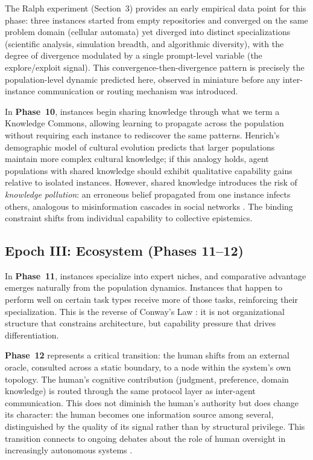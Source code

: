 The Ralph experiment (Section~3) provides an early empirical data point for this phase: three instances started from empty repositories and converged on the same problem domain (cellular automata) yet diverged into distinct specializations (scientific analysis, simulation breadth, and algorithmic diversity), with the degree of divergence modulated by a single prompt-level variable (the explore/exploit signal). This convergence-then-divergence pattern is precisely the population-level dynamic predicted here, observed in miniature before any inter-instance communication or routing mechanism was introduced.

In \textbf{Phase~10}, instances begin sharing knowledge through what we term a Knowledge Commons, allowing learning to propagate across the population without requiring each instance to rediscover the same patterns. Henrich's \cite{henrich2004} demographic model of cultural evolution predicts that larger populations maintain more complex cultural knowledge; if this analogy holds, agent populations with shared knowledge should exhibit qualitative capability gains relative to isolated instances. However, shared knowledge introduces the risk of \emph{knowledge pollution}: an erroneous belief propagated from one instance infects others, analogous to misinformation cascades in social networks \cite{vosoughi2018}. The binding constraint shifts from individual capability to collective epistemics.

\subsection{Epoch III: Ecosystem (Phases 11--12)}

In \textbf{Phase~11}, instances specialize into expert niches, and comparative advantage \cite{ricardo1817} emerges naturally from the population dynamics. Instances that happen to perform well on certain task types receive more of those tasks, reinforcing their specialization. This is the reverse of Conway's Law \cite{conway1968}: it is not organizational structure that constrains architecture, but capability pressure that drives differentiation.

\textbf{Phase~12} represents a critical transition: the human shifts from an external oracle, consulted across a static boundary, to a node within the system's own topology. The human's cognitive contribution (judgment, preference, domain knowledge) is routed through the same protocol layer as inter-agent communication. This does not diminish the human's authority but does change its character: the human becomes one information source among several, distinguished by the quality of its signal rather than by structural privilege. This transition connects to ongoing debates about the role of human oversight in increasingly autonomous systems \cite{gabriel2020}.

